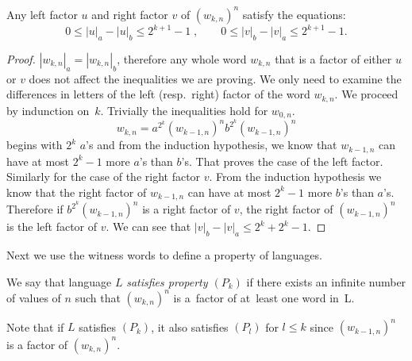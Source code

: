\begin{lemma}\label{lm:witness_words_inequalities}
    Any left factor $u$ and right factor $v$ of ${(w_{k,n})}^n$ satisfy the equations:
    \begin{equation}
        0 \leq |u|_a - |u|_b \leq 2^{k+1}-1 \; , \qquad 0 \leq |v|_b - |v|_a \leq 2^{k+1}-1.
    \end{equation}
\end{lemma}

\begin{proof}
    $|w_{k,n}|_a = |w_{k,n}|_b$, therefore any whole word $w_{k,n}$ that is a factor of either $u$ or $v$ does not affect the inequalities we are proving. We only need to examine the differences in letters of the left (resp.~right) factor of the word $w_{k,n}$. We proceed by indunction on~$k$. Trivially the inequalities hold for $w_{0,n}$.
    \[
        w_{k,n} = a^{2^k}{(w_{k-1,n})}^{n}b^{2^k}{(w_{k-1,n})}^{n}
    \] begins with $2^k$ $a$'s and from the induction hypothesis, we know that $w_{k-1,n}$ can have at most $2^k-1$ more $a$'s than $b$'s. That proves the case of the left factor.
    Similarly for the case of the right factor $v$. From the induction hypothesis we know that the right factor of $w_{k-1,n}$ can have at most $2^k-1$ more $b$'s than $a$'s. Therefore if $b^{2^k}{(w_{k-1,n})}^{n}$ is a right factor of $v$, the right factor of ${(w_{k-1,n})}^{n}$ is the left factor of $v$. We can see that $|v|_b - |v|_a \leq 2^k + 2^k -1$.
\end{proof}

Next we use the witness words to define a property of languages.

\begin{defn}
    We say that language $L$ \emph{satisfies property $(P_k)$} if there exists an infinite number of values of $n$ such that ${(w_{k,n})}^n$ is a~factor of at~least one word in~L.
\end{defn}

Note that if $L$ satisfies $(P_k)$, it also satisfies $(P_l)$ for $l \leq k$ since ${(w_{k-1,n})}^n$ is a factor of ${(w_{k,n})}^n$.

